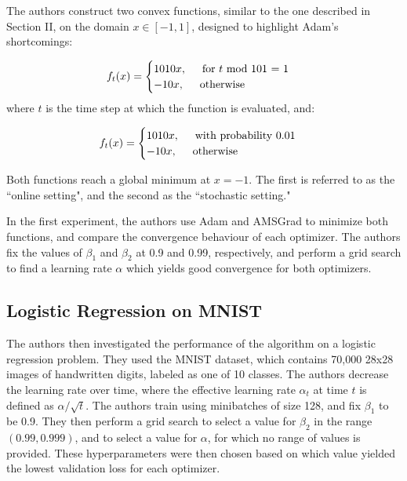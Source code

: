 \documentclass[letterpaper, 10 pt, conference]{ieeeconf}  %
\begin{document}
The authors construct two convex functions, similar to the one described in Section II, on the domain $x \in [-1,1]$, designed to highlight Adam's shortcomings:

\[
    f_{t}(x) = 
    \begin{cases}
     	1010x, \hspace{5mm} \text{for } t \text{ mod 101 = 1} \\
        -10x, \hspace{5mm} \text{otherwise}
    \end{cases}
\]
where $t$ is the time step at which the function is evaluated, and:

\[
    f_{t}(x) = 
    \begin{cases}
     	1010x, \hspace{5mm} \text{with probability 0.01}\\
        -10x, \hspace{5mm} \text{otherwise}
    \end{cases}
\]

Both functions reach a global minimum at $x = -1$. The first is referred to as the ``online setting", and the second as the ``stochastic setting."

In the first experiment, the authors use Adam and AMSGrad to minimize both functions, and compare the convergence behaviour of each optimizer. The authors fix the values of  $\beta_{1}$ and $\beta_{2}$ at 0.9 and 0.99, respectively, and perform a grid search to find a learning rate $\alpha$ which yields good convergence for both optimizers. 

\subsection{Logistic Regression on MNIST}

The authors then investigated the performance of the algorithm on a logistic regression problem. They used the MNIST dataset, which contains 70,000 28x28 images of handwritten digits, labeled as one of 10 classes. The authors decrease the learning rate over time, where the effective learning rate $\alpha_t$ at time $t$ is defined as $\alpha / \sqrt{t}$. The authors train using minibatches of size 128, and fix  $\beta_{1}$ to be 0.9. They then perform a grid search to select a value for $\beta_2$ in the range $(0.99, 0.999)$, and to select a value for $\alpha$, for which no range of values is provided. These hyperparameters were then chosen based on which value yielded the lowest validation loss for each optimizer. 
\end{document}
